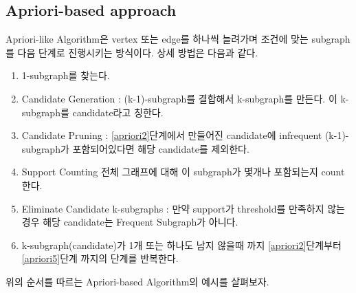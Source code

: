 \documentclass{oblivoir}
\begin{document}
		\subsection{Apriori-based approach}
		Apriori-like Algorithm은 vertex 또는 edge를 하나씩 늘려가며 조건에 맞는 subgraph를 다음 단계로 진행시키는 방식이다. 상세 방법은 다음과 같다.
		
		\begin{enumerate}
			\item 1-subgraph를 찾는다. \label{apriori1}
			\item Candidate Generation : (k-1)-subgraph를 결합해서 k-subgraph를 만든다. 이 k-subgraph를 candidate라고 칭한다. \label{apriori2}
			\item Candidate Pruning : \ref{apriori2}단계에서 만들어진 candidate에 infrequent (k-1)-subgraph가 포함되어있다면 해당 candidate를 제외한다. \label{apriori3}
			\item Support Counting 전체 그래프에 대해 이 subgraph가 몇개나 포함되는지 count한다. \label{apriori4}
			\item Eliminate Candidate k-subgraphs : 만약 support가 threshold를 만족하지 않는 경우 해당 candidate는 Frequent Subgraph가 아니다.  \label{apriori5}
			\item k-subgraph(candidate)가 1개 또는 하나도 남지 않을때 까지 \ref{apriori2}단계부터 \ref{apriori5}단계 까지의 단계를 반복한다. \label{apriori6}
		\end{enumerate}
	
		위의 순서를 따르는 Apriori-based Algorithm의 예시를 살펴보자.\\
		
\end{document}

